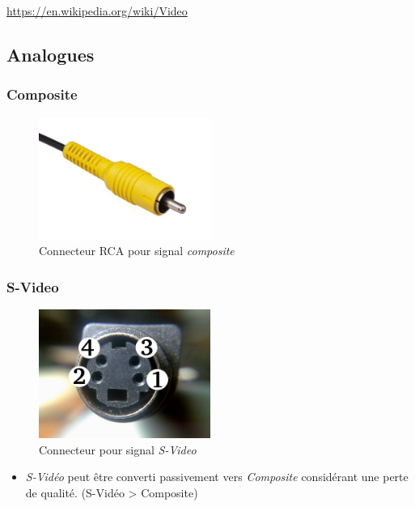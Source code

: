 \documentclass[
  french,
]{book}
\providecommand{\tightlist}{%
  \setlength{\itemsep}{0pt}\setlength{\parskip}{0pt}}
\begin{document}
\url{https://en.wikipedia.org/wiki/Video}

\hypertarget{analogues}{%
\subsection{Analogues}\label{analogues}}

\hypertarget{composite}{%
\subsubsection{Composite}\label{composite}}

\begin{figure}
\centering
\includegraphics[width=0.5\textwidth,height=\textheight]{medias/lexique/signaux/analogue/composite.jpg}
\caption{Connecteur RCA pour signal \emph{composite}}
\end{figure}

\hypertarget{s-video}{%
\subsubsection{S-Video}\label{s-video}}

\begin{figure}
\centering
\includegraphics[width=0.5\textwidth,height=\textheight]{medias/lexique/signaux/analogue/svideo.jpg}
\caption{Connecteur pour signal \emph{S-Video}}
\end{figure}

\begin{itemize}
\tightlist
\item
  \emph{S-Vidéo} peut être converti passivement vers \emph{Composite} considérant une perte de qualité. (S-Vidéo \textgreater{} Composite)
\end{itemize}
\end{document}
